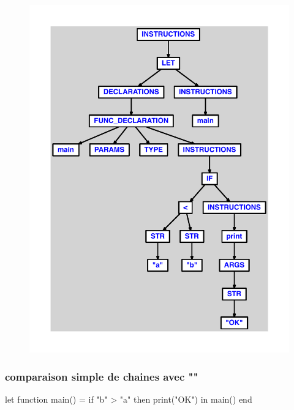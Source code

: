 \documentclass{article}
\begin{document}
\begin{figure}[H]\centering\includegraphics[max width=\textwidth]{ast/ast_175.pdf}\end{figure}\subsubsection{comparaison simple de chaines avec ""}
\begin{verbatimtab}
let
	function main() =
		if "b" > "a" then print("OK")
in main() end
\end{verbatimtab}
\end{document}
